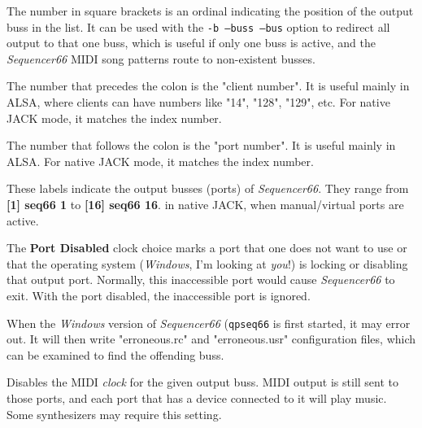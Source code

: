    \setcounter{ItemCounter}{0}      %

   The number in square brackets is an ordinal indicating the position
   of the output buss in the list.
   It can be used with the \texttt{-b --buss --bus} option to redirect all
   output to that one buss, which is useful if only one buss is active, and the
   \textsl{Sequencer66} MIDI song patterns route to non-existent busses.

   The number that precedes the colon is the "client number".
   It is useful mainly in ALSA, where clients can have numbers like "14",
   "128", "129", etc.  For native JACK mode, it matches the index number.

   The number that follows the colon is the "port number".
   It is useful mainly in ALSA.
   For native JACK mode, it matches the index number.

   These labels indicate the output busses (ports) of \textsl{Sequencer66}.
   They range from \textbf{[1] seq66 1} to \textbf{[16] seq66 16}.
   in native JACK, when manual/virtual ports are active.

   The \textbf{Port Disabled} clock choice marks a port
   that one does not want to use or that the operating system
   (\textsl{Windows}, I'm looking at \textsl{you}!)
   is locking or disabling that output port.
   Normally, this inaccessible port would cause \textsl{Sequencer66} to exit.
   With the port disabled, the inaccessible port is ignored.

   When the \textsl{Windows} version of \textsl{Sequencer66}
   (\texttt{qpseq66} is first started, it may error out.
   It will then write "erroneous.rc" and "erroneous.usr" configuration
   files, which can be examined to find the offending buss.

   Disables the MIDI \textsl{clock} for the given output buss.
   MIDI output is still sent to those ports, and
   each port that has a device connected to it will play music.
   Some synthesizers may require this setting.

